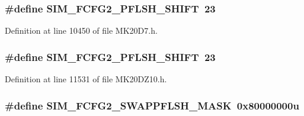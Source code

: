 \subsubsection[{\texorpdfstring{S\+I\+M\+\_\+\+F\+C\+F\+G2\+\_\+\+P\+F\+L\+S\+H\+\_\+\+S\+H\+I\+FT}{SIM_FCFG2_PFLSH_SHIFT}}]{\setlength{\rightskip}{0pt plus 5cm}\#define S\+I\+M\+\_\+\+F\+C\+F\+G2\+\_\+\+P\+F\+L\+S\+H\+\_\+\+S\+H\+I\+FT~23}\hypertarget{group___s_i_m___register___masks_ga6ebc783954b7a0846e166efc03ca3a30}{}\label{group___s_i_m___register___masks_ga6ebc783954b7a0846e166efc03ca3a30}


Definition at line 10450 of file M\+K20\+D7.\+h.

\subsubsection[{\texorpdfstring{S\+I\+M\+\_\+\+F\+C\+F\+G2\+\_\+\+P\+F\+L\+S\+H\+\_\+\+S\+H\+I\+FT}{SIM_FCFG2_PFLSH_SHIFT}}]{\setlength{\rightskip}{0pt plus 5cm}\#define S\+I\+M\+\_\+\+F\+C\+F\+G2\+\_\+\+P\+F\+L\+S\+H\+\_\+\+S\+H\+I\+FT~23}\hypertarget{group___s_i_m___register___masks_ga6ebc783954b7a0846e166efc03ca3a30}{}\label{group___s_i_m___register___masks_ga6ebc783954b7a0846e166efc03ca3a30}


Definition at line 11531 of file M\+K20\+D\+Z10.\+h.

\subsubsection[{\texorpdfstring{S\+I\+M\+\_\+\+F\+C\+F\+G2\+\_\+\+S\+W\+A\+P\+P\+F\+L\+S\+H\+\_\+\+M\+A\+SK}{SIM_FCFG2_SWAPPFLSH_MASK}}]{\setlength{\rightskip}{0pt plus 5cm}\#define S\+I\+M\+\_\+\+F\+C\+F\+G2\+\_\+\+S\+W\+A\+P\+P\+F\+L\+S\+H\+\_\+\+M\+A\+SK~0x80000000u}\hypertarget{group___s_i_m___register___masks_ga9e43eb1fe8cf3bc2b415b94b85409da3}{}\label{group___s_i_m___register___masks_ga9e43eb1fe8cf3bc2b415b94b85409da3}


